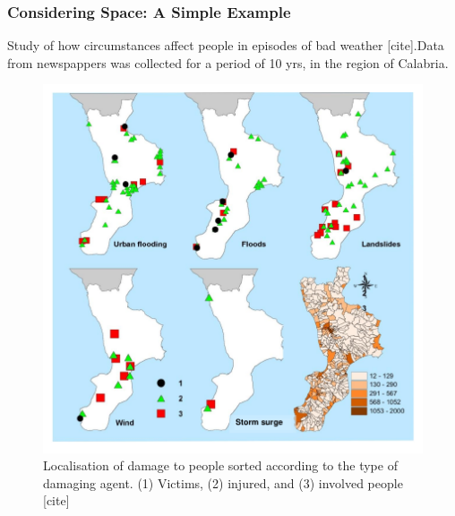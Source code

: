 \documentclass[hyperref={pdfpagelabels=true}]{beamer}
\begin{document}
\begin{frame}
\frametitle{Considering Space: A Simple Example}
Study of how circumstances affect people in episodes of bad weather [cite].Data from newspappers was collected for a period of 10 yrs, in the region of Calabria.
\begin{figure}
\includegraphics[scale=0.55]{damage_agent.png}
\caption{\tiny{Localisation of damage to people sorted according to the type of damaging agent. (1) Victims, (2) injured, and (3) involved people [cite]}}
\end{figure}
\end{frame}
\end{document}
